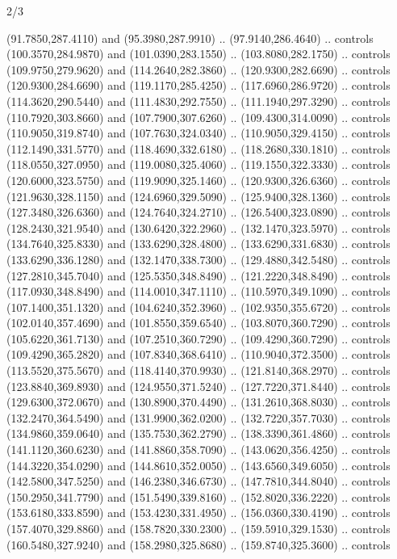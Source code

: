 \begin{flagdescription}{2/3}
\begin{scope}[shift={(0.5\flaglength,0.5)},scale=\flagwidth/480]
\begin{scope}[y=0.8pt, x=0.80pt, yscale=-1,shift={(-450,-300)}]
\begin{scope}[cm={{1.02948,0.0,0.0,1.02948,(-13.26599,6.99414)}}]
\begin{scope}[shift={(341.0917,90.34325)}]
  (91.7850,287.4110) and (95.3980,287.9910) .. (97.9140,286.4640) .. controls
  (100.3570,284.9870) and (101.0390,283.1550) .. (103.8080,282.1750) .. controls
  (109.9750,279.9620) and (114.2640,282.3860) .. (120.9300,282.6690) .. controls
  (120.9300,284.6690) and (119.1170,285.4250) .. (117.6960,286.9720) .. controls
  (114.3620,290.5440) and (111.4830,292.7550) .. (111.1940,297.3290) .. controls
  (110.7920,303.8660) and (107.7900,307.6260) .. (109.4300,314.0090) .. controls
  (110.9050,319.8740) and (107.7630,324.0340) .. (110.9050,329.4150) .. controls
  (112.1490,331.5770) and (118.4690,332.6180) .. (118.2680,330.1810) .. controls
  (118.0550,327.0950) and (119.0080,325.4060) .. (119.1550,322.3330) .. controls
  (120.6000,323.5750) and (119.9090,325.1460) .. (120.9300,326.6360) .. controls
  (121.9630,328.1150) and (124.6960,329.5090) .. (125.9400,328.1360) .. controls
  (127.3480,326.6360) and (124.7640,324.2710) .. (126.5400,323.0890) .. controls
  (128.2430,321.9540) and (130.6420,322.2960) .. (132.1470,323.5970) .. controls
  (134.7640,325.8330) and (133.6290,328.4800) .. (133.6290,331.6830) .. controls
  (133.6290,336.1280) and (132.1470,338.7300) .. (129.4880,342.5480) .. controls
  (127.2810,345.7040) and (125.5350,348.8490) .. (121.2220,348.8490) .. controls
  (117.0930,348.8490) and (114.0010,347.1110) .. (110.5970,349.1090) .. controls
  (107.1400,351.1320) and (104.6240,352.3960) .. (102.9350,355.6720) .. controls
  (102.0140,357.4690) and (101.8550,359.6540) .. (103.8070,360.7290) .. controls
  (105.6220,361.7130) and (107.2510,360.7290) .. (109.4290,360.7290) .. controls
  (109.4290,365.2820) and (107.8340,368.6410) .. (110.9040,372.3500) .. controls
  (113.5520,375.5670) and (118.4140,370.9930) .. (121.8140,368.2970) .. controls
  (123.8840,369.8930) and (124.9550,371.5240) .. (127.7220,371.8440) .. controls
  (129.6300,372.0670) and (130.8900,370.4490) .. (131.2610,368.8030) .. controls
  (132.2470,364.5490) and (131.9900,362.0200) .. (132.7220,357.7030) .. controls
  (134.9860,359.0640) and (135.7530,362.2790) .. (138.3390,361.4860) .. controls
  (141.1120,360.6230) and (141.8860,358.7090) .. (143.0620,356.4250) .. controls
  (144.3220,354.0290) and (144.8610,352.0050) .. (143.6560,349.6050) .. controls
  (142.5800,347.5250) and (146.2380,346.6730) .. (147.7810,344.8040) .. controls
  (150.2950,341.7790) and (151.5490,339.8160) .. (152.8020,336.2220) .. controls
  (153.6180,333.8590) and (153.4230,331.4950) .. (156.0360,330.4190) .. controls
  (157.4070,329.8860) and (158.7820,330.2300) .. (159.5910,329.1530) .. controls
  (160.5480,327.9240) and (158.2980,325.8680) .. (159.8740,325.3600) .. controls

\end{scope}
\end{scope}
\end{scope}
\end{scope}
\end{flagdescription}
